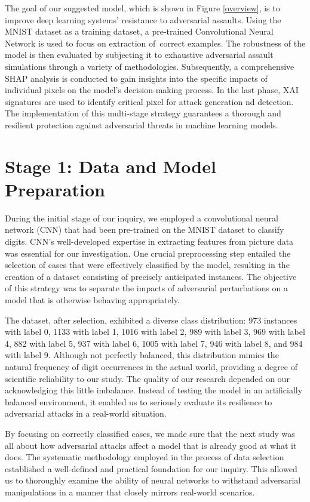 \documentclass[10pt, conference, a4paper, final]{IEEEtran}
\begin{document}
The goal of our suggested model, which is shown in Figure \ref {overview}, is to improve deep learning systems' 
resistance to adversarial assaults. Using the MNIST dataset as a training dataset, a pre-trained Convolutional 
Neural Network is used to focus on extraction of correct examples. The robustness of the model is then evaluated 
by subjecting it to exhaustive adversarial assault simulations through a variety of methodologies. Subsequently, 
a comprehensive SHAP analysis is conducted to gain insights into the specific impacts of individual pixels on the 
model's decision-making process. In the last phase, XAI signatures are used to identify critical pixel for attack 
generation nd detection. The implementation of this multi-stage strategy guarantees a thorough and resilient protection 
against adversarial threats in machine learning models.


\section{Stage 1: Data and Model Preparation}

During the initial stage of our inquiry, we employed a convolutional neural network (CNN) that had been pre-trained on 
the MNIST dataset to classify digits. CNN's well-developed expertise in extracting features from picture data was essential 
for our investigation. One crucial preprocessing step entailed the selection of cases that were effectively classified by the 
model, resulting in the creation of a dataset consisting of precisely anticipated instances. The objective of this strategy was 
to separate the impacts of adversarial perturbations on a model that is otherwise behaving appropriately.

The dataset, after selection, exhibited a diverse class distribution: 973 instances with label 0, 1133 with label 1, 1016 with 
label 2, 989 with label 3, 969 with label 4, 882 with label 5, 937 with label 6, 1005 with label 7, 946 with label 8, and 984 with 
label 9. Although not perfectly balanced, this distribution mimics the natural frequency of digit occurrences in the actual world,
 providing a degree of scientific reliability to our study. The quality of our research depended on our acknowledging this little 
 imbalance. Instead of testing the model in an artificially balanced environment, it enabled us to seriously evaluate its resilience 
 to adversarial attacks in a real-world situation.

By focusing on correctly classified cases, we made sure that the next study was all about how adversarial attacks affect a model 
that is already good at what it does. The systematic methodology employed in the process of data selection established a well-defined 
and practical foundation for our inquiry. This allowed us to thoroughly examine the ability of neural networks to withstand adversarial
 manipulations in a manner that closely mirrors real-world scenarios.
\end{document}
